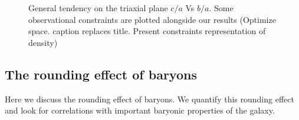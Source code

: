 \documentclass[a4paper,fleqn,usenatbib]{mnras}
\begin{document}
\begin{figure}
  \centering
  \hfill
  \hfill
  \caption{General tendency on the triaxial plane $c/a$ Vs $b/a$. Some observational constraints are plotted alongside our results (Optimize space. caption replaces title.  Present constraints representation of density)}
  \label{fig:Triaxiality_DM_MHD}
\end{figure}

\subsection{The rounding effect of baryons}
Here we discuss the rounding effect of baryons. We quantify this rounding effect and look for correlations with important baryonic properties of the galaxy.
\end{document}
